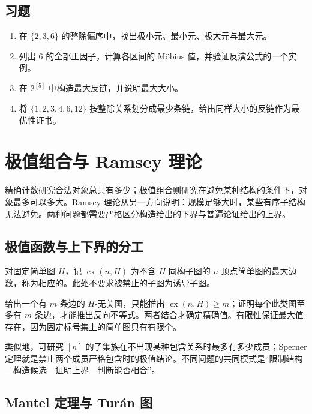 \documentclass[UTF8,12pt,a4paper,fontset=fandol]{ctexbook}
\begin{document}
\section{习题}
\begin{enumerate}
  \item\label{ex:posets-1} 在 $\{2,3,6\}$ 的整除偏序中，找出极小元、最小元、极大元与最大元。
  \item\label{ex:posets-2} 列出 $6$ 的全部正因子，计算各区间的 M\"obius 值，并验证反演公式的一个实例。
  \item\label{ex:posets-3} 在 $2^{[5]}$ 中构造最大反链，并说明最大大小。
  \item\label{ex:posets-4} 将 $\{1,2,3,4,6,12\}$ 按整除关系划分成最少条链，给出同样大小的反链作为最优性证书。
\end{enumerate}

\chapter{极值组合与 Ramsey 理论}
\label{ch:extremal-ramsey}

精确计数研究合法对象总共有多少；极值组合则研究在避免某种结构的条件下，对象最多可以多大。Ramsey 理论从另一方向说明：规模足够大时，某些有序子结构无法避免。两种问题都需要严格区分构造给出的下界与普遍论证给出的上界。

\section{极值函数与上下界的分工}

\begin{definition}
对固定简单图 $H$，记 $\operatorname{ex}(n,H)$ 为不含 $H$ 同构子图的 $n$ 顶点简单图的最大边数，称为相应的。此处不要求被禁止的子图为诱导子图。
\end{definition}

给出一个有 $m$ 条边的 $H$-无关图，只能推出 $\operatorname{ex}(n,H)\ge m$；证明每个此类图至多有 $m$ 条边，才能推出反向不等式。两者结合才确定精确值。有限性保证最大值存在，因为固定标号集上的简单图只有有限个。

类似地，可研究 $[n]$ 的子集族在不出现某种包含关系时最多有多少成员；Sperner 定理就是禁止两个成员严格包含时的极值结论。不同问题的共同模式是“限制结构---构造候选---证明上界---判断能否相合”。

\section{Mantel 定理与 Tur\'an 图}
\end{document}
